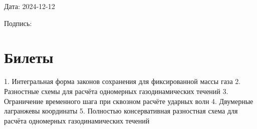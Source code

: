 \documentclass[a4paper,12pt]{article}
\begin{document}
Дата: 2024-12-12

Подпись: \underline{\hspace{3cm}}

\section*{Билеты}
1. Интегральная форма законов сохранения для фиксированной массы газа
2. Разностные схемы для расчёта одномерных газодинамических течений
3. Ограничение временного шага при сквозном расчёте ударных волн
4. Двумерные лагранжевы координаты
5. Полностью консервативная разностная схема для расчёта одномерных газодинамических течений
\end{document}
